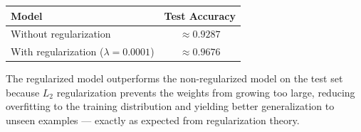 \begin{answer}
\begin{center}
\begin{tabular}{lc}
\toprule
Model & Test Accuracy \\
\midrule
Without regularization & $\approx 0.9287$ \\
With regularization ($\lambda=0.0001$) & $\approx 0.9676$ \\
\bottomrule
\end{tabular}
\end{center}

The regularized model outperforms the non-regularized model on the test set because $L_2$ regularization prevents the weights from growing too large, reducing overfitting to the training distribution and yielding better generalization to unseen examples — exactly as expected from regularization theory.
\end{answer}

